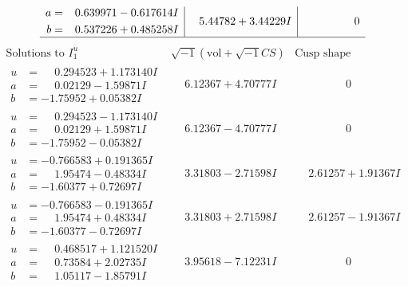 \documentclass[1p]{elsarticle_modified}
\theoremstyle{definition}
\newcommand{\I}{\sqrt{-1}}
\begin{document}
$$\begin{array}{c|c|c}
\begin{aligned}
a &= \phantom{-}0.639971 - 0.617614 I \\
b &= \phantom{-}0.537226 + 0.485258 I\end{aligned}
 & \phantom{-}5.44782 + 3.44229 I & \phantom{-0.000000 } 0\\
 \hline 
 \end{array}$$\newpage$$\begin{array}{c|c|c}  
\text{Solutions to }I^u_{1}& \I (\text{vol} + \sqrt{-1}CS) & \text{Cusp shape}\\
 \hline 
\begin{aligned}
u &= \phantom{-}0.294523 + 1.173140 I \\
a &= \phantom{-}0.02129 - 1.59871 I \\
b &= -1.75952 + 0.05382 I\end{aligned}
 & \phantom{-}6.12367 + 4.70777 I & \phantom{-0.000000 } 0 \\ \hline\begin{aligned}
u &= \phantom{-}0.294523 - 1.173140 I \\
a &= \phantom{-}0.02129 + 1.59871 I \\
b &= -1.75952 - 0.05382 I\end{aligned}
 & \phantom{-}6.12367 - 4.70777 I & \phantom{-0.000000 } 0 \\ \hline\begin{aligned}
u &= -0.766583 + 0.191365 I \\
a &= \phantom{-}1.95474 - 0.48334 I \\
b &= -1.60377 + 0.72697 I\end{aligned}
 & \phantom{-}3.31803 - 2.71598 I & \phantom{-}2.61257 + 1.91367 I \\ \hline\begin{aligned}
u &= -0.766583 - 0.191365 I \\
a &= \phantom{-}1.95474 + 0.48334 I \\
b &= -1.60377 - 0.72697 I\end{aligned}
 & \phantom{-}3.31803 + 2.71598 I & \phantom{-}2.61257 - 1.91367 I \\ \hline\begin{aligned}
u &= \phantom{-}0.468517 + 1.121520 I \\
a &= \phantom{-}0.73584 + 2.02735 I \\
b &= \phantom{-}1.05117 - 1.85791 I\end{aligned}
 & \phantom{-}3.95618 - 7.12231 I & \phantom{-0.000000 } 0 \\ \hline\begin{aligned}

\end{aligned}
\end{array}$$
\end{document}
